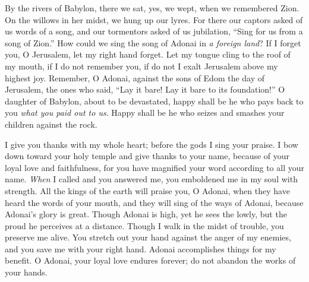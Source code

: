 \begin{biblechapter} %
 By the rivers of Babylon, 
there we sat, yes, we wept, 
when we remembered Zion.
\verse On the willows in her midst, 
we hung up our lyres.
\verse For there our captors asked of us 
words of a song, 
and our tormentors asked of us jubilation, 
“Sing for us from a song of Zion.”
\verse How could we sing the song of Adonai 
in \textit{a foreign land}?
\verse If I forget you, O Jerusalem, 
let my right hand forget.
\verse Let my tongue cling to the roof of my mouth, 
if I do not remember you, 
if do not I exalt Jerusalem 
above my highest joy.
\verse Remember, O Adonai, against the sons of Edom 
the day of Jerusalem, 
the ones who said, “Lay it bare! Lay it bare 
to its foundation!”
\verse O daughter of Babylon, about to be devastated, 
happy shall be he who pays back to you 
\textit{what you paid out to us}.
\verse Happy shall be he who seizes 
and smashes your children 
against the rock.
\end{biblechapter}

\begin{biblechapter} %
 I give you thanks with my whole heart; 
before the gods I sing your praise.
\verse I bow down toward your holy temple 
and give thanks to your name, 
because of your loyal love and faithfulness, 
for you have magnified your word according to all your name.
\verse \textit{When} I called and you answered me, 
you emboldened me in my soul with strength.
\verse All the kings of the earth 
will praise you, O Adonai, 
when they have heard the words of your mouth,
\verse and they will sing of the ways of Adonai, 
because Adonai’s glory is great.
\verse Though Adonai is high, yet he sees the lowly, 
but the proud he perceives at a distance.
\verse Though I walk in the midst of trouble, 
you preserve me alive. 
You stretch out your hand against the anger of my enemies, 
and you save me with your right hand.
\verse Adonai accomplishes things for my benefit. 
O Adonai, your loyal love endures forever; 
do not abandon the works of your hands.
\end{biblechapter}

